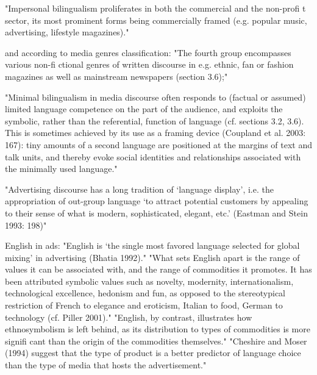 "Impersonal bilingualism proliferates in
both the commercial and the non-profi t sector, its most prominent forms being
commercially framed (e.g. popular music, advertising, lifestyle magazines)."

and according to media genres classification:
"The fourth group encompasses various non-fi ctional genres of written
discourse in e.g. ethnic, fan or fashion magazines as well as mainstream
newspapers (section 3.6);"

"Minimal bilingualism
in media discourse often responds to (factual or assumed) limited language
competence on the part of the audience, and exploits the symbolic, rather
than the referential, function of language (cf. sections 3.2, 3.6). This is
sometimes achieved by its use as a framing device (Coupland et al. 2003:
167): tiny amounts of a second language are positioned at the margins of
text and talk units, and thereby evoke social identities and relationships
associated with the minimally used language."

"Advertising discourse has a long tradition of ‘language display’, i.e. the
appropriation of out-group language ‘to attract potential customers by
appealing to their sense of what is modern, sophisticated, elegant, etc.’
(Eastman and Stein 1993: 198)"

English in ads:
"English is ‘the single most favored language selected for global mixing’
in advertising (Bhatia 1992)."
"What sets English apart
is the range of values it can be associated with, and the range of commodities
it promotes. It has been attributed symbolic values such as novelty, modernity,
internationalism, technological excellence, hedonism and fun, as opposed
to the stereotypical restriction of French to elegance and eroticism, Italian to
food, German to technology (cf. Piller 2001)."
"English, by contrast, illustrates how ethnosymbolism is left behind,
as its distribution to types of commodities is more signifi cant than the origin
of the commodities themselves."
"Cheshire and Moser (1994) suggest that the type of product is a better predictor
of language choice than the type of media that hosts the advertisement."

